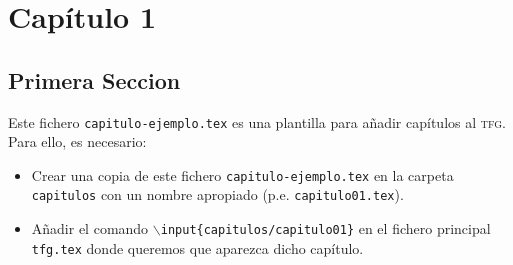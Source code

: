 
\chapter{Capítulo 1}

\section{Primera Seccion}

Este fichero \texttt{capitulo-ejemplo.tex} es una plantilla para añadir capítulos al \textsc{tfg}. Para ello, es necesario:
\begin{itemize}
  \item Crear una copia de este fichero \texttt{capitulo-ejemplo.tex} en la carpeta \texttt{capitulos} con un nombre apropiado (p.e. \texttt{capitulo01.tex}).
  \item Añadir el comando \texttt{$\backslash$input\{capitulos/capitulo01\}} en el fichero principal \texttt{tfg.tex} donde queremos que aparezca dicho capítulo.
\end{itemize}


\endinput

